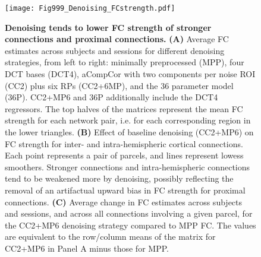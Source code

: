 \documentclass{article}
\begin{document}


\begin{figure}
    \centering
    \texttt{[image: Fig999\_Denoising\_FCstrength.pdf]}
    \caption{\small \textbf{Denoising tends to lower FC strength of stronger connections and proximal connections.} \textbf{(A)} Average FC estimates across subjects and sessions for different denoising strategies, from left to right: minimally preprocessed (MPP), four DCT bases (DCT4), aCompCor with two components per noise ROI (CC2) plus six RPs (CC2+6MP), and the 36 parameter model (36P). CC2+MP6 and 36P additionally include the DCT4 regressors. 
    The top halves of the matrices represent the mean FC strength for each network pair, i.e. for each corresponding region in the lower triangles. \textbf{(B)} Effect of baseline denoising (CC2+MP6) on FC strength for inter- and intra-hemispheric cortical connections. Each point represents a pair of parcels, and lines represent lowess smoothers. Stronger connections and intra-hemispheric connections tend to be weakened more by denoising, possibly reflecting the removal of an artifactual upward bias in FC strength for proximal connections. \textbf{(C)} Average change in FC estimates across subjects and sessions, and across all connections involving a given parcel, for the CC2+MP6 denoising strategy compared to MPP FC. The values are equivalent to the row/column means of the matrix for CC2+MP6 in Panel A minus those for MPP.}
    \label{app:fig:baselineFC}
\end{figure}
\end{document}
